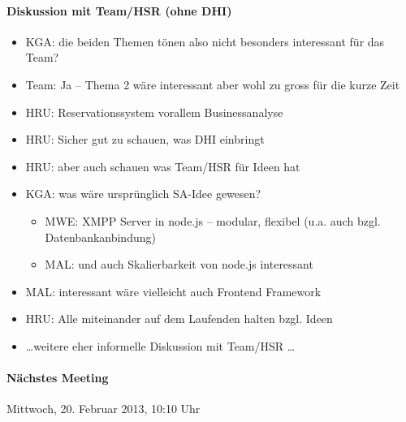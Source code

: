 \paragraph*{Diskussion mit Team/HSR (ohne DHI)}
\begin{itemize}
\item KGA: die beiden Themen tönen also nicht besonders interessant für das Team?
\item Team: Ja -- Thema 2 wäre interessant aber wohl zu gross für die kurze Zeit
\item HRU: Reservationssystem vorallem Businessanalyse
\item HRU: Sicher gut zu schauen, was DHI einbringt
\item HRU: aber auch schauen was Team/HSR für Ideen hat
\item KGA: was wäre ursprünglich SA-Idee gewesen?
\begin{itemize}
	\item MWE: XMPP Server in node.js -- modular, flexibel (u.a. auch bzgl. Datenbankanbindung)
	\item MAL: und auch Skalierbarkeit von node.js interessant
\end{itemize}
\item MAL: interessant wäre vielleicht auch Frontend Framework
\item HRU: Alle miteinander auf dem Laufenden halten bzgl. Ideen
\item \ldots weitere eher informelle Diskussion mit Team/HSR \ldots
\end{itemize}

\paragraph*{Nächstes Meeting}

Mittwoch, 20. Februar 2013, 10:10 Uhr
